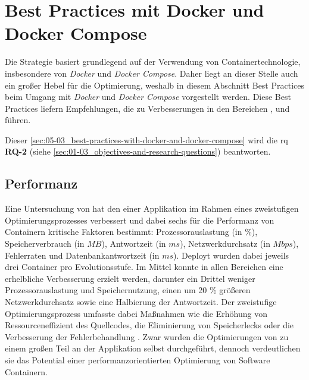 \section{Best Practices mit Docker und Docker Compose}
\label{sec:05-03_best-practices-with-docker-and-docker-compose}

Die  Strategie basiert grundlegend auf der Verwendung von Containertechnologie, insbesondere von \textit{Docker} und \textit{Docker Compose}. Daher liegt an dieser Stelle auch ein großer Hebel für die Optimierung, weshalb in diesem Abschnitt Best Practices beim Umgang mit \textit{Docker} und \textit{Docker Compose} vorgestellt werden. Diese Best Practices liefern Empfehlungen, die zu Verbesserungen in den Bereichen ,  und  führen.

Dieser \autoref{sec:05-03_best-practices-with-docker-and-docker-compose} wird die \acrlong{rq} \textbf{RQ-2} (siehe \autoref{sec:01-03_objectives-and-research-questions}) beantworten.

\subsection{Performanz}
\label{subsec:05-03-01_performance}

Eine Untersuchung von \citeauthor{002:Optimizing-Cloud-Applications-with-DevOps} hat den  einer Applikation im Rahmen eines zweistufigen Optimierungsprozesses verbessert und dabei sechs für die Performanz von Containern kritische Faktoren bestimmt: Prozessorauslastung (in $\%$), Speicherverbrauch (in $MB$), Antwortzeit (in $ms$), Netzwerkdurchsatz (in $Mbps$), Fehlerraten und Datenbankantwortzeit (in $ms$). Deployt wurden dabei jeweils drei Container pro Evolutionsstufe. Im Mittel konnte in allen Bereichen eine erhelbliche Verbesserung erzielt werden, darunter ein Drittel weniger Prozessorauslastung und Speichernutzung, einen um 20 \% größeren Netzwerkdurchsatz sowie eine Halbierung der Antwortzeit. Der zweistufige Optimierungsprozess umfasste dabei Maßnahmen wie die Erhöhung von Ressourceneffizient des Quellcodes, die Eliminierung von Speicherlecks oder die Verbesserung der Fehlerbehandlung \cite{002:Optimizing-Cloud-Applications-with-DevOps}. Zwar wurden die Optimierungen von \citeauthor{002:Optimizing-Cloud-Applications-with-DevOps} zu einem großen Teil an der Applikation selbst durchgeführt, dennoch verdeutlichen sie das Potential einer performanzorientierten Optimierung von Software Containern.


